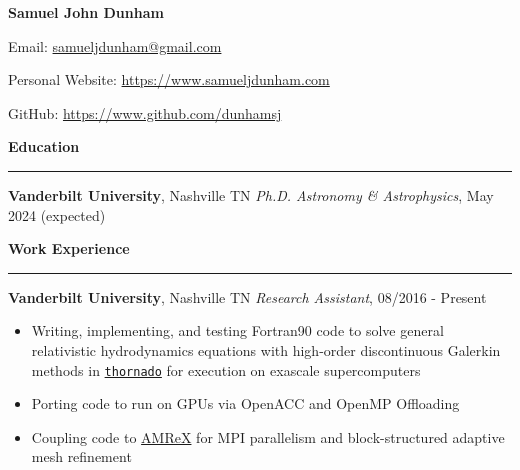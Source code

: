 \documentclass[10pt]{article}
\begin{document}
\flushleft

{\large \textbf{Samuel John Dunham}}
\vspace{1em}

Email: \href{mailto:samueljdunham@gmail.com}%
                   {samueljdunham@gmail.com}
\vspace{0.5em}

Personal Website: \url{https://www.samueljdunham.com}
\vspace{0.5em}

GitHub: \url{https://www.github.com/dunhamsj}

\vspace{1em}

\textbf{Education}\vspace{0.5em}\hrule\vspace{1em}

\textbf{Vanderbilt University}, Nashville TN\newline
\textit{Ph.D. Astronomy \& Astrophysics}, May 2024 (expected)
\vspace{1em}

\textbf{Work Experience}\vspace{0.5em}\hrule\vspace{1em}

\textbf{Vanderbilt University}, Nashville TN\newline
\textit{Research Assistant}, 08/2016 - Present
\begin{itemize}\setlength\itemsep{0.1cm}
  \item
    Writing, implementing, and testing
    Fortran90 code to solve general relativistic hydrodynamics
    equations with high-order discontinuous Galerkin methods
    in \href{https://www.github.com/endeve/thornado}{\texttt{thornado}}
    for execution on exascale supercomputers
  \item
    Porting code to run on GPUs via OpenACC and OpenMP Offloading
  \item
    Coupling code to \href{https://www.github.com/AMReX-Codes/amrex}{AMReX}
    for MPI parallelism and block-structured adaptive mesh refinement
\end{itemize}
\vspace{1em}
\end{document}
